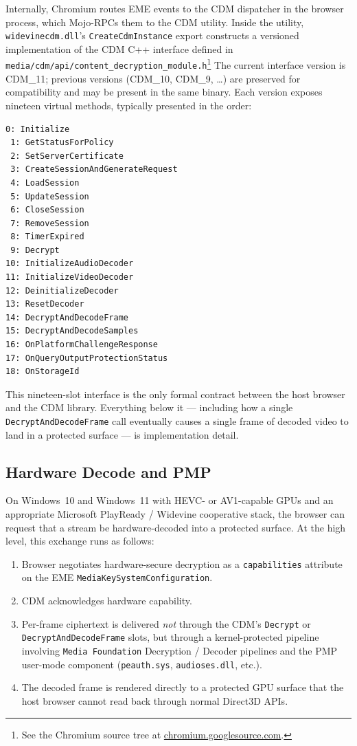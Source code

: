 \documentclass[11pt,letterpaper]{article}
\begin{document}
Internally, Chromium routes EME events to the CDM dispatcher in the
browser process, which Mojo-RPCs them to the CDM utility.  Inside the
utility, \texttt{widevinecdm.dll}'s \texttt{CreateCdmInstance} export
constructs a versioned implementation of the CDM C++ interface
defined in
\texttt{media/cdm/api/content\_decryption\_module.h}\footnote{See
the Chromium source tree at \href{https://chromium.googlesource.com/}{chromium.googlesource.com}.}
The current interface version is CDM\_11; previous versions (CDM\_10,
CDM\_9, \dots) are preserved for compatibility and may be present in
the same binary.  Each version exposes nineteen virtual methods,
typically presented in the order:

\begin{lstlisting}[basicstyle=\ttfamily\scriptsize]
 0: Initialize
 1: GetStatusForPolicy
 2: SetServerCertificate
 3: CreateSessionAndGenerateRequest
 4: LoadSession
 5: UpdateSession
 6: CloseSession
 7: RemoveSession
 8: TimerExpired
 9: Decrypt
10: InitializeAudioDecoder
11: InitializeVideoDecoder
12: DeinitializeDecoder
13: ResetDecoder
14: DecryptAndDecodeFrame
15: DecryptAndDecodeSamples
16: OnPlatformChallengeResponse
17: OnQueryOutputProtectionStatus
18: OnStorageId
\end{lstlisting}

This nineteen-slot interface is the only formal contract between the
host browser and the CDM library.  Everything below it --- including
how a single \texttt{DecryptAndDecodeFrame} call eventually causes a
single frame of decoded video to land in a protected surface --- is
implementation detail.

\subsection{Hardware Decode and PMP}

On Windows~10 and Windows~11 with HEVC- or AV1-capable GPUs and an
appropriate Microsoft PlayReady / Widevine cooperative stack, the
browser can request that a stream be hardware-decoded into a
protected surface.  At the high level, this exchange runs as follows:

\begin{enumerate}[itemsep=2pt,topsep=2pt]
  \item Browser negotiates hardware-secure decryption as a
        \texttt{capabilities} attribute on the EME
        \texttt{MediaKeySystemConfiguration}.
  \item CDM acknowledges hardware capability.
  \item Per-frame ciphertext is delivered \emph{not} through the CDM's
        \texttt{Decrypt} or \texttt{DecryptAndDecodeFrame} slots, but
        through a kernel-protected pipeline involving
        \texttt{Media Foundation} Decryption / Decoder pipelines and
        the PMP user-mode component (\texttt{peauth.sys},
        \texttt{audioses.dll}, etc.).
  \item The decoded frame is rendered directly to a protected GPU
        surface that the host browser cannot read back through normal
        Direct3D APIs.
\end{enumerate}
\end{document}
